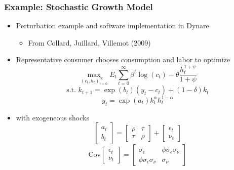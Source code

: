 \documentclass[bigger,handout]{beamer}
\begin{document}
\begin{frame}
\frametitle{Example: Stochastic Growth Model}
\begin{itemize}
\item Perturbation example and software implementation in Dynare
\begin{itemize}
\item From Collard, Juillard, Villemot (2009)
\end{itemize}
\item Representative consumer chooses consumption and labor to optimize
\begin{equation*}
\underset{(c_t,h_t)_{t=0}^{\infty}}{\max}E_{t}\sum_{t=0}^{\infty}\beta^{t}\log(c_t)-\theta\frac{h_t^{1+\psi}}{1+\psi}
\end{equation*}
\begin{equation*}
\text{s.t. }k_{t+1}=\exp(b_t)(y_t-c_t)+(1-\delta)k_t
\end{equation*}
\begin{equation*}
y_{t}=\exp(a_t)k_{t}^{\alpha}h_{t}^{1-\alpha}
\end{equation*}
\item with exogeneous shocks
\begin{equation*}
\begin{bmatrix} a_t \\ b_t \end{bmatrix} = 
\begin{bmatrix} \rho & \tau \\ \tau & \rho \end{bmatrix} +
\begin{bmatrix} \epsilon_t \\ \nu_t \end{bmatrix}
\end{equation*}
\begin{equation*}
\text{Cov}\begin{bmatrix} \epsilon_t \\ \nu_t \end{bmatrix} =
\begin{bmatrix} \sigma_\epsilon & \phi\sigma_\epsilon\sigma_\nu \\ \phi\sigma_\epsilon\sigma_\nu & \sigma_\nu \end{bmatrix}
\end{equation*}

\end{itemize}
\end{frame}
\end{document}
